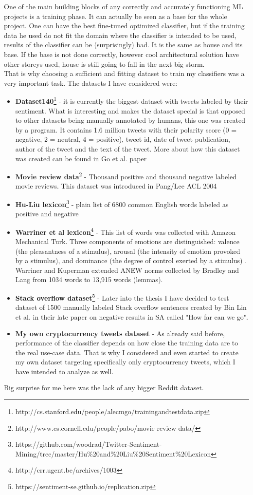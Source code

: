 One of the main building blocks of any correctly and accurately functioning ML projects is a training phase. It can actually be seen as a base for the whole project. One can have the best fine-tuned optimized classifier, but if the training data he used do not fit the domain where the classifier is intended to be used, results of the classifier can be (surprisingly) bad. It is the same as house and its base. If the base is not done correctly, however cool architectural solution have other storeys used, house is still going to fall in the next big storm.\\
That is why choosing a sufficient and fitting dataset to train my classifiers was a very important task. The datasets I have considered were:
\begin{itemize}
  \item \textbf{Dataset140}\footnote{http://cs.stanford.edu/people/alecmgo/trainingandtestdata.zip} - it is currently the biggest dataset with tweets labeled by their sentiment. What is interesting and makes the dataset special is that opposed to other datasets being manually annotated by humans, this one was created by a program. It contains 1.6 million tweets with their polarity score (0 = negative, 2 = neutral, 4 = positive), tweet id, date of tweet publication, author of the tweet and the text of the tweet. More about how this dataset was created can be found in Go et al. paper \cite{go2009twitter}
  \item \textbf{Movie review data}\footnote{http://www.cs.cornell.edu/people/pabo/movie-review-data/} - Thousand positive and thousand negative labeled movie reviews. This dataset was introduced in Pang/Lee ACL 2004 \cite{pang2004sentimental}
  \item \textbf{Hu-Liu lexicon}\footnote{https://github.com/woodrad/Twitter-Sentiment-Mining/tree/master/Hu\%20and\%20Liu\%20Sentiment\%20Lexicon} - plain list of 6800 common English words labeled as positive and negative
  \item \textbf{Warriner et al lexicon}\footnote{http://crr.ugent.be/archives/1003} - This list of words was collected with Amazon Mechanical Turk. Three components of emotions are distinguished: valence (the pleasantness of a stimulus), arousal (the intensity of emotion provoked by a stimulus), and dominance (the degree of control exerted by a stimulus) \cite{warriner2013norms}. Warriner and Kuperman extended ANEW norms collected by Bradley and Lang from 1034 words to 13,915 words (lemmas).
  \item \textbf{Stack overflow dataset}\footnote{https://sentiment-se.github.io/replication.zip} - Later into the thesis I have decided to test dataset of 1500 manually labeled Stack overflow sentences created by Bin Lin et al. in their late paper on negative results in SA called "How far can we go".
    \item \textbf{My own cryptocurrency tweets dataset} - As already said before, performance of the classifier depends on how close the training data are to the real use-case data. That is why I considered and even started to create my own dataset targeting specifically only cryptocurrency tweets, which I have intended to analyze as well.
\end{itemize}

Big surprise for me here was the lack of any bigger Reddit dataset.